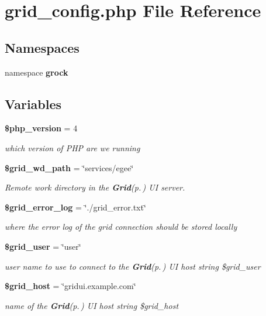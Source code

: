 \section{grid\_\-config.php File Reference}
\label{src_2grid__config_8php}
\subsection*{Namespaces}
\begin{CompactItemize}
\item 
namespace {\bf grock}
\end{CompactItemize}
\subsection*{Variables}
\begin{CompactItemize}
\item 
{\bf \$php\_\-version} = 4
\begin{CompactList}\small\item\em which version of PHP are we running \item\end{CompactList}\item 
{\bf \$grid\_\-wd\_\-path} = \char`\"{}services/egee\char`\"{}
\begin{CompactList}\small\item\em Remote work directory in the {\bf Grid}{\rm (p.\,\pageref{classGrid})} UI server. \item\end{CompactList}\item 
{\bf \$grid\_\-error\_\-log} = \char`\"{}./grid\_\-error.txt\char`\"{}
\begin{CompactList}\small\item\em where the error log of the grid connection should be stored locally \item\end{CompactList}\item 
{\bf \$grid\_\-user} = \char`\"{}user\char`\"{}
\begin{CompactList}\small\item\em user name to use to connect to the {\bf Grid}{\rm (p.\,\pageref{classGrid})} UI host  string \$grid\_\-user \item\end{CompactList}\item 
{\bf \$grid\_\-host} = \char`\"{}gridui.example.com\char`\"{}
\begin{CompactList}\small\item\em name of the {\bf Grid}{\rm (p.\,\pageref{classGrid})} UI host  string \$grid\_\-host \item\end{CompactList}\item 

\end{CompactItemize}
